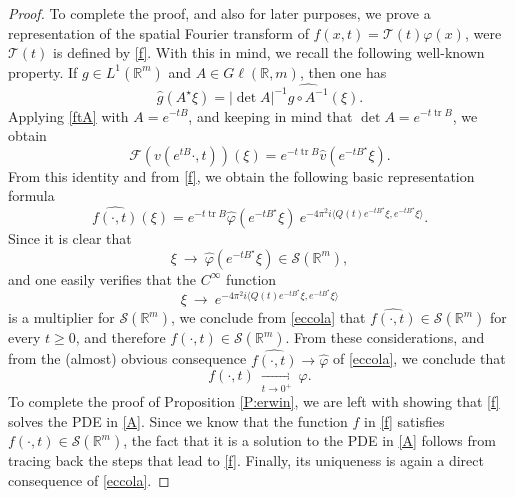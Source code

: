\documentclass[11pt,a4paper]{amsart}
\def \R {\mathbb{R}}
\def \vf{\varphi}
\def \So {\mathscr{S}(\Rm)}
\newcommand{\Rm}{\mathbb R^m}
\numberwithin{equation}{section}
\newcommand{\tr}{\operatorname{tr}}
\newcommand{\sa}{\langle}
\newcommand{\da}{\rangle}
\numberwithin{equation}{section}
\begin{document}
\begin{proof}
To complete the proof, and also for later purposes, we prove a representation of the spatial Fourier transform of $f(x,t) = \mathcal T(t) \vf(x)$, were $\mathcal T(t)$ is defined by \eqref{f}. With this in mind, we recall the following well-known property. If $g\in L^1(\Rm)$ and $A\in G\ell(\R,m)$, then one has
\begin{equation}\label{ftA}
\hat g(A^\star \xi) = |\operatorname{det} A|^{-1} \widehat{g \circ A^{-1}}(\xi).
\end{equation} 
Applying \eqref{ftA} with $A = e^{-tB}$, and keeping in mind that $\det A = e^{-t \tr B}$, we obtain
\[
\mathscr F(v(e^{t B} \cdot,t))(\xi) = e^{-t \tr B} \hat v(e^{-tB^\star}\xi).
\]
From this identity and from  \eqref{f}, we obtain the following basic representation formula
\begin{equation}\label{eccola}
\widehat{f(\cdot,t)}(\xi) = e^{-t \tr B} \hat \vf(e^{-tB^\star}\xi) \  e^{-4\pi^2 i  \sa Q(t) e^{-tB^\star}\xi,e^{-tB^\star}\xi\da}.
\end{equation}
Since it is clear that 
\[
\xi\ \longrightarrow\ \hat \vf(e^{-tB^\star}\xi) \in \mathscr S(\Rm),
\]
and one easily verifies that the $C^\infty$ function 
\[
\xi\ \longrightarrow\  e^{-4\pi^2 i  \sa Q(t) e^{-tB^\star}\xi,e^{-tB^\star}\xi\da}
\]
is a multiplier for $\mathscr S(\Rm)$, we conclude from \eqref{eccola} that $\widehat{f(\cdot,t)}\in \mathscr S(\Rm)$ for every $t\ge 0$, and therefore $f(\cdot,t) \in \mathscr S(\Rm)$. From these considerations, and from the (almost) obvious consequence $\widehat{f(\cdot,t)}\to \hat \vf$ of \eqref{eccola}, we conclude that 
\[
f(\cdot,t)\ \underset{t\to 0^+}{\longrightarrow}\ \vf.
\]
To complete the proof of Proposition \ref{P:erwin}, we are left with showing that \eqref{f} solves the PDE in \eqref{A}. Since we know that the function $f$ in \eqref{f} satisfies $f(\cdot,t)\in \So$, the fact that it is a solution to the PDE in \eqref{A} follows from tracing back the steps that lead to \eqref{f}. Finally, its uniqueness is again a direct consequence of \eqref{eccola}.

\end{proof}
\end{document}

